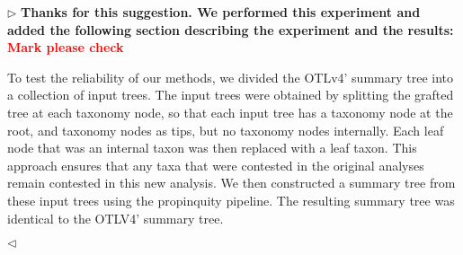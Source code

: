 \documentclass{article}
\newenvironment{reply}{$\triangleright$\bf}{$\triangleleft$}
\renewenvironment{quote}
               {\list{}{\rightmargin\leftmargin}%
                \item\relax\normalfont}
               {\endlist}
\begin{document}
\begin{reply}
Thanks for this suggestion.  We performed this experiment and added the following section describing the experiment and the results: \textcolor{red}{\textbf{Mark please check}}
\begin{quote}
To test the reliability of our methods, we divided the OTLv4' summary
tree into a collection of input trees. The input trees were obtained
by splitting the grafted tree at each taxonomy node, so that each
input tree has a taxonomy node at the root, and taxonomy nodes as
tips, but no taxonomy nodes internally.  Each leaf node that was an
internal taxon was then replaced with a leaf taxon. This approach
ensures that any taxa that were contested in the original analyses
remain contested in this new analysis.  We then constructed a summary
tree from these input trees using the propinquity pipeline.  The
resulting summary tree was identical to the OTLV4' summary tree.  
\end{quote}

\end{reply}



\end{document}
